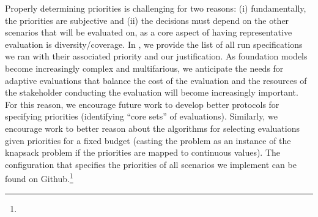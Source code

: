Properly determining priorities is challenging for two reasons: (i) fundamentally, the priorities are subjective and (ii) the decisions must depend on the other scenarios that will be evaluated on, as a core aspect of having representative evaluation is diversity/coverage. 
In , we provide the list of all run specifications we ran with their associated priority and our justification.
As foundation models become increasingly complex and multifarious, we anticipate the needs for adaptive evaluations that balance the cost of the evaluation and the resources of the stakeholder conducting the evaluation will become increasingly important.
For this reason, we encourage future work to develop better protocols for specifying priorities (\eg identifying ``core sets'' of evaluations). 
Similarly, we encourage work to better reason about the algorithms for selecting evaluations given priorities for a fixed budget (\eg casting the problem as an instance of the knapsack problem if the priorities are mapped to continuous values).
The configuration that specifies the priorities of all scenarios we implement can be found on Github.\footnote{\githubUrl}